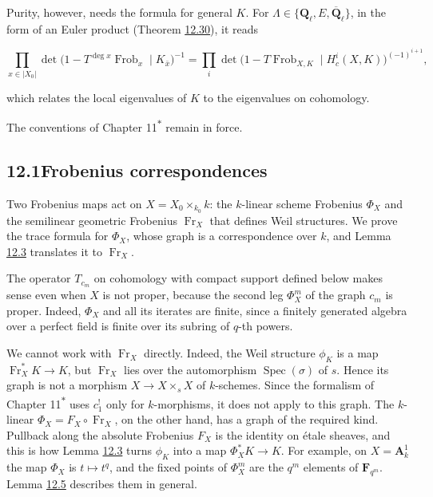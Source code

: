 \documentclass[11pt]{article}
\newcommand{\bpout}[1]{#1\textsuperscript{\hyperlink{bp-outside}{\ensuremath{\ast}}}}
\begin{document}
Purity, however, needs the formula for general \(K\). For \(\Lambda\in\{\mathbf Q_\ell,E,\overline{\mathbf Q}_\ell\}\), in the form of an Euler product (Theorem \hyperref[bp92]{12.30}), it reads

\[
\prod_{x\in|X_0|}\det\bigl(1-T^{\deg x}\operatorname{Frob}_x\mid K_{\bar x}\bigr)^{-1}
=\prod_i\det\bigl(1-T\operatorname{Frob}_{X,K}\mid H^i_c(X,K)\bigr)^{(-1)^{i+1}},
\]

which relates the local eigenvalues of \(K\) to the eigenvalues on cohomology.

The conventions of Chapter \bpout{11} remain in force.

\subsection*{\texorpdfstring{12.1\quad Frobenius correspondences}{12.1 Frobenius correspondences}}
\label{bp5}%
\label{bp6}%
Two Frobenius maps act on \(X=X_0\times_{k_0}k\): the \(k\)-linear scheme Frobenius \(\Phi_X\) and the semilinear geometric Frobenius \(\operatorname{Fr}_X\) that defines Weil structures. We prove the trace formula for \(\Phi_X\), whose graph is a correspondence over \(k\), and Lemma \hyperref[bp9]{12.3} translates it to \(\operatorname{Fr}_X\).

The operator \(T_{c_m}\) on cohomology with compact support defined below makes sense even when \(X\) is not proper, because the second leg \(\Phi_X^m\) of the graph \(c_m\) is proper. Indeed, \(\Phi_X\) and all its iterates are finite, since a finitely generated algebra over a perfect field is finite over its subring of \(q\)-th powers.

We cannot work with \(\operatorname{Fr}_X\) directly. Indeed, the Weil structure \(\phi_K\) is a map \(\operatorname{Fr}_X^*K\to K\), but \(\operatorname{Fr}_X\) lies over the automorphism \(\operatorname{Spec}(\sigma)\) of \(s\). Hence its graph is not a morphism \(X\to X\times_sX\) of \(k\)-schemes. Since the formalism of Chapter \bpout{11} uses \(c_1^!\) only for \(k\)-morphisms, it does not apply to this graph. The \(k\)-linear \(\Phi_X=F_X\circ\operatorname{Fr}_X\), on the other hand, has a graph of the required kind. Pullback along the absolute Frobenius \(F_X\) is the identity on étale sheaves, and this is how Lemma \hyperref[bp9]{12.3} turns \(\phi_K\) into a map \(\Phi_X^*K\to K\). For example, on \(X=\mathbf A^1_k\) the map \(\Phi_X\) is \(t\mapsto t^q\), and the fixed points of \(\Phi_X^m\) are the \(q^m\) elements of \(\mathbf F_{q^m}\). Lemma \hyperref[bp15]{12.5} describes them in general.
\end{document}
